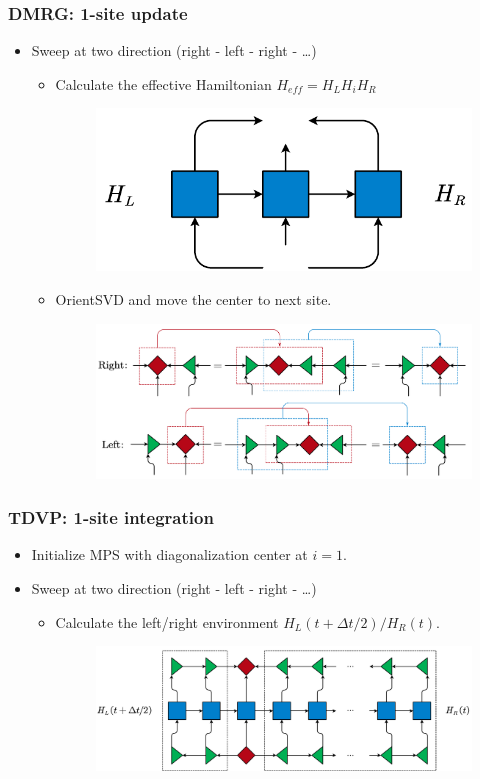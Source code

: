 \documentclass{beamer}
\begin{document}
\begin{frame}
	\frametitle{DMRG: 1-site update}
	\begin{itemize}
		\item Sweep at two direction (right - left - right - \dots)
		\begin{itemize}
			\item Calculate the effective Hamiltonian $H_{eff} = H_L H_i H_R$
			\begin{figure}[H]
				\includegraphics[width=0.3 \linewidth]{images/effH1.pdf}
			\end{figure}
			\item OrientSVD and move the center to next site.
			\begin{figure}[H]
				\includegraphics[width=0.6 \linewidth]{images/orientSVD.pdf}
			\end{figure}
		\end{itemize}
	\end{itemize}
\end{frame}


\begin{frame}
	\frametitle{TDVP: 1-site integration}
	\begin{itemize}
		\item Initialize MPS with diagonalization center at $i=1$.
		\newpage
		\item Sweep at two direction (right - left - right - \dots)
		\begin{itemize}
			\item Calculate the left/right environment $H_L(t+\Delta t/2)/H_R(t)$.
			\begin{figure}[H]
				\includegraphics[width=0.8 \linewidth]{images/LRenv1 t.pdf}
			\end{figure}
		\end{itemize}
	\end{itemize}
\end{frame}
\end{document}
